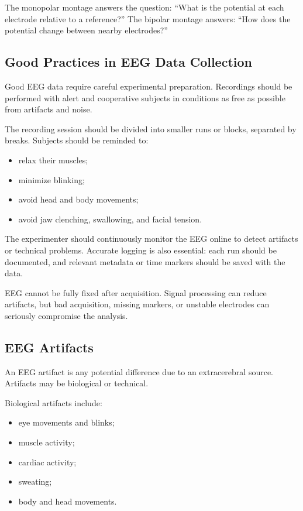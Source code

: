 \begin{authornote}
The monopolar montage answers the question: ``What is the potential at each electrode relative to a reference?'' The bipolar montage answers: ``How does the potential change between nearby electrodes?''
\end{authornote}

\subsection{Good Practices in EEG Data Collection}

Good EEG data require careful experimental preparation. Recordings should be performed with alert and cooperative subjects in conditions as free as possible from artifacts and noise.

The recording session should be divided into smaller runs or blocks, separated by breaks. Subjects should be reminded to:

\begin{itemize}[noitemsep]
    \item relax their muscles;
    \item minimize blinking;
    \item avoid head and body movements;
    \item avoid jaw clenching, swallowing, and facial tension.
\end{itemize}

The experimenter should continuously monitor the EEG online to detect artifacts or technical problems. Accurate logging is also essential: each run should be documented, and relevant metadata or time markers should be saved with the data.

\begin{authornote}
EEG cannot be fully fixed after acquisition. Signal processing can reduce artifacts, but bad acquisition, missing markers, or unstable electrodes can seriously compromise the analysis.
\end{authornote}

\subsection{EEG Artifacts}

An EEG artifact is any potential difference due to an extracerebral source. Artifacts may be biological or technical.

Biological artifacts include:

\begin{itemize}[noitemsep]
    \item eye movements and blinks;
    \item muscle activity;
    \item cardiac activity;
    \item sweating;
    \item body and head movements.
\end{itemize}

